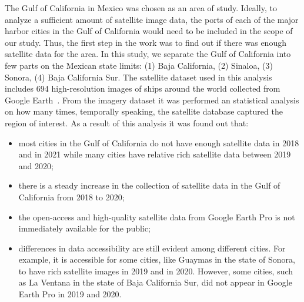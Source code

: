 The Gulf of California in Mexico was chosen as an area of study. Ideally, to analyze a sufficient amount of satellite image data, the ports of each of the major harbor cities in the Gulf of California would need to be included in the scope of our study. Thus, the first step in the work was to find out if there was enough satellite data for the area. In this study, we separate the Gulf of California into few parts on the Mexican state limits: (1) Baja California, (2) Sinaloa, (3) Sonora, (4) Baja California Sur. The satellite dataset used in this analysis includes 694 high-resolution images of ships around the world collected from Google Earth~\cite{lutherborrowship}. From the imagery dataset it was performed an statistical analysis on how many times, temporally speaking, the satellite database captured the region of interest. As a result of this analysis it was found out that:
\begin{itemize}
    \item most cities in the Gulf of California do not have enough satellite data in 2018 and in 2021 while many cities have relative rich satellite data between 2019 and 2020;
    \item there is a steady increase in the collection of satellite data in the Gulf of California from 2018 to 2020;
    \item the open-access and high-quality satellite data from Google Earth Pro is not immediately available for the public;
    \item differences in data accessibility are still evident among different cities. For example, it is accessible for some cities, like Guaymas in the state of Sonora, to have rich satellite images in 2019 and in 2020. However, some cities, such as La Ventana in the state of Baja California Sur, did not appear in Google Earth Pro in 2019 and 2020.
\end{itemize}


